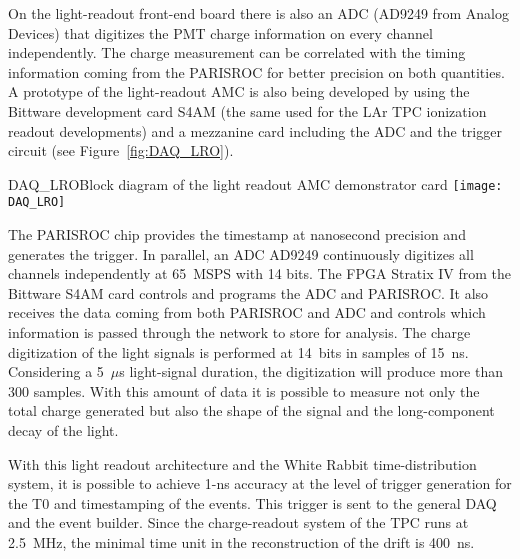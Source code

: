 On the light-readout front-end board there is also an ADC (AD9249 from
Analog Devices) that digitizes the PMT charge information on every
channel independently. The charge measurement can be correlated with
the timing information coming from the PARISROC for better precision
on both quantities. A prototype of the light-readout AMC is also being
developed by using the Bittware development card S4AM (the same used
for the LAr TPC ionization readout developments) and a mezzanine card
including the ADC and the trigger circuit (see
Figure~\ref{fig:DAQ_LRO}).
\begin{cdrfigure}{DAQ_LRO}{Block diagram of the light readout AMC demonstrator card}
 \texttt{[image: DAQ\_LRO]}  
\end{cdrfigure}

The PARISROC chip provides the timestamp at nanosecond precision and
generates the trigger. In parallel, an ADC AD9249 continuously
digitizes all channels independently at 65~MSPS with 14 bits. The FPGA
Stratix IV from the Bittware S4AM card controls and programs the ADC
and PARISROC. It also receives the data coming from both PARISROC and
ADC and controls which information is passed through the network to
store for analysis.  The charge digitization of the light signals is
performed at 14~bits in samples of 15~ns. Considering a 5~$\mu$s
light-signal duration, the digitization will produce more than 300
samples. With this amount of data it is possible to measure not only
the total charge generated but also the shape of the signal and the
long-component decay of the light.


With this light readout architecture and the White Rabbit
time-distribution system, it is possible to achieve 1-ns accuracy at
the level of trigger generation for the T0 and timestamping of the
events. This trigger is sent to the general DAQ and the event
builder. Since the charge-readout system of the TPC runs at 2.5~MHz,
the minimal time unit in the reconstruction of the drift is 400~ns.
